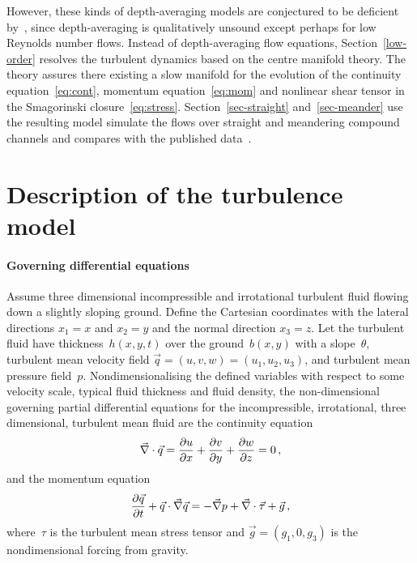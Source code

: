 \documentclass[12pt,a5paper]{article}
\begin{document}
However, these kinds of depth-averaging models are conjectured to be deficient by~\cite{Roberts1996}, since depth-averaging is qualitatively unsound except perhaps for low Reynolds number flows.
Instead of depth-averaging flow equations, Section~\ref{low-order} resolves the turbulent dynamics based on the centre manifold theory. 
The theory assures there existing a slow manifold for the evolution of the continuity equation~\eqref{eq:cont}, momentum equation~\eqref{eq:mom} and nonlinear shear tensor in the Smagorinski closure~\eqref{eq:stress}.
Section~\ref{sec-straight} and~\ref{sec-meander} use the resulting model simulate the flows over straight and meandering compound channels and compares with the published data~\cite[e.g.]{Bousmar2002,Liu2009}.


\section{Description of the turbulence model}
\label{description}

\paragraph{Governing differential equations} 
Assume three dimensional incompressible and irrotational turbulent fluid flowing down a slightly sloping ground. 
Define the Cartesian coordinates with the lateral directions $x_1=x$ and $x_2=y$ and the normal direction $x_3=z$. 
Let the turbulent fluid have thickness~$h(x,y,t)$ over the ground~$b(x,y)$ with a slope~$\theta$, turbulent mean velocity field $\vec q=(u,v,w)=(u_1,u_2,u_3)$, and turbulent mean pressure field~$p$.
Nondimensionalising the defined variables with respect to some velocity scale, typical fluid thickness and fluid density, the non-dimensional governing partial differential equations for the incompressible, irrotational, three dimensional, turbulent mean fluid are the continuity equation
\begin{equation}
    \divv\vec q=\D xu+\D yv+\D zw=0\,,\label{eq:cont}
\end{equation}
and the momentum equation
\begin{equation}
    \D t{\vec q} +\vec q\cdot\grad\vec q
    =-\grad p +\divv\vec\tau +\vec{g}\,,\label{eq:mom}
\end{equation}
where~$\tau$ is the turbulent mean stress tensor and $\vec g=(g_1,0,g_3)$ is the nondimensional forcing from gravity.
\end{document}
